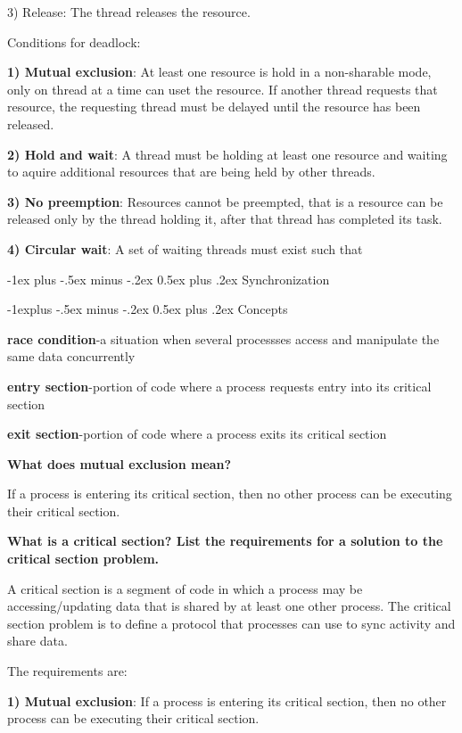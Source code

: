 \documentclass[8pt,landscape]{article}
\makeatletter
\renewcommand{\section}{\@startsection{section}{1}{0mm}%
                                {-1ex plus -.5ex minus -.2ex}%
                                {0.5ex plus .2ex}%
                                {\normalfont\footnotesize\bfseries}}
\renewcommand{\subsection}{\@startsection{subsection}{2}{0mm}%
                                {-1explus -.5ex minus -.2ex}%
                                {0.5ex plus .2ex}%
                                {\normalfont\scriptsize\bfseries}}
\makeatother
\begin{document}
\begin{multicols}{3}
\begin{tiny}
3) Release: The thread releases the resource.

Conditions for deadlock:

\textbf{1) Mutual exclusion}: At least one resource is hold in a non-sharable mode, only on thread 
at a time can uset the resource. If another thread requests that resource, the requesting thread 
must be delayed until the resource has been released.

\textbf{2) Hold and wait}: A thread must be holding at least one resource and waiting to aquire additional resources that are being held by other threads.

\textbf{3) No preemption}: Resources cannot be preempted, that is a resource can be released only 
by the thread holding it, after that thread has completed its task.

\textbf{4) Circular wait}: A set of waiting threads must exist such that 

\section{Synchronization}

\subsection{Concepts}

\textbf{race condition}-a situation when several processses access and manipulate the same data
concurrently

\textbf{entry section}-portion of code where a process requests entry into its critical section

\textbf{exit section}-portion of code where a process exits its critical section

\textbf{What does mutual exclusion mean?}

If a process is entering its critical section, then no other process can be executing their 
critical section.

\textbf{What is a critical section? List the requirements for a solution to the critical section 
problem.}

A critical section is a segment of code in which a process may be accessing/updating data that is
shared by at least one other process. The critical section problem is to define a protocol that 
processes can use to sync activity and share data.

The requirements are:

\textbf{1) Mutual exclusion}: If a process is entering its critical section, then no other 
process can be executing their critical section.


\end{tiny}
\end{multicols}
\end{document}

